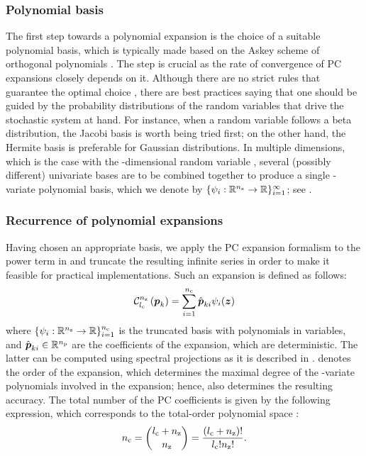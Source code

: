 \subsubsection{Polynomial basis}

The first step towards a polynomial expansion is the choice of a suitable
polynomial basis, which is typically made based on the Askey scheme of
orthogonal polynomials \cite{xiu2010}. The step is crucial as the rate of
convergence of PC expansions closely depends on it. Although there are no strict
rules that guarantee the optimal choice \cite{knio2006}, there are best
practices saying that one should be guided by the probability distributions of
the random variables that drive the stochastic system at hand. For instance,
when a random variable follows a beta distribution, the Jacobi basis is worth
being tried first; on the other hand, the Hermite basis is preferable for
Gaussian distributions. In multiple dimensions, which is the case with the
\nz-dimensional random variable \vz, several (possibly different)
univariate bases are to be combined together to produce a single
\nz-variate polynomial basis, which we denote by $\{ \psi_i: \mathbb{R}^{n_\mathrm{z}}
\to \mathbb{R} \}_{i = 1}^\infty$; see \cite{xiu2010}.

\subsubsection{Recurrence of polynomial expansions}

Having chosen an appropriate basis, we apply the PC expansion formalism to the
power term in  and truncate the resulting infinite series in
order to make it feasible for practical implementations. Such an expansion is
defined as follows:
\begin{equation} \elab{pc-expansion}
  \chaos{\nz}{\lc}{\vp_k} = \sum_{i = 1}^{\nc} \hat{\vp}_{ki} \psi_i(\vz)
\end{equation}
where $\{ \psi_i: \mathbb{R}^{n_\mathrm{z}} \to \mathbb{R} \}_{i = 1}^{{n_\mathrm{c}}}$ is the truncated
basis with \nc polynomials in \nz variables, and $\hat{\boldsymbol{p}}_{ki} \in \mathbb{R}^{n_\mathrm{p}}$
are the coefficients of the expansion, which are deterministic. The latter can
be computed using spectral projections as it is described in
. \lc denotes the order of the expansion, which determines
the maximal degree of the \nz-variate polynomials involved in the expansion;
hence, \lc also determines the resulting accuracy. The total number of the PC
coefficients \nc is given by the following expression, which corresponds to the
total-order polynomial space \cite{eldred2008, beck2011}:
\begin{equation} \elab{pc-terms}
  \nc = { \lc + \nz \choose \nz } = \frac{(\lc + \nz)!}{\lc! \nz!}.
\end{equation}

